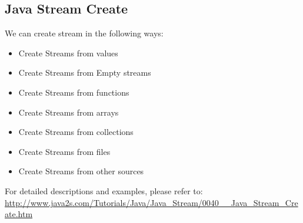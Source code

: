 \documentclass[twoside]{article}
\begin{document}
\subsection{Java Stream Create}
We can create stream in the following ways:
\begin{itemize}
    \item Create Streams from values
    \item Create Streams from Empty streams
    \item Create Streams from functions
    \item Create Streams from arrays
    \item Create Streams from collections
    \item Create Streams from files
    \item Create Streams from other sources
\end{itemize} 
For detailed descriptions and examples,  please refer to: \url{http://www.java2s.com/Tutorials/Java/Java_Stream/0040__Java_Stream_Create.htm}
\end{document}
